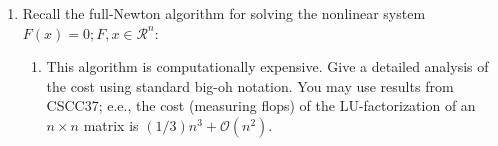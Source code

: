 \documentclass{article}
\begin{document}
\thispagestyle{fancy}
\begin{enumerate}
    \item Recall the full-Newton algorithm for solving the nonlinear system $F(x) = 0; F,x\in \mathcal{R}^n:$

        \begin{algorithm}[H]
            \SetAlgoNoLine
            \SetEndCharOfAlgoLine{}
        \end{algorithm}
        \begin{enumerate}
            \item This algorithm is computationally expensive. Give a detailed analysis of the cost using standard big-oh notation. You may use results from CSCC37; e.e., the cost (measuring flops) of the LU-factorization of an $n \times n$ matrix is $(1/3)n^3 + \mathcal O (n^2)$.


\end{enumerate}
\end{enumerate}
\end{document}
